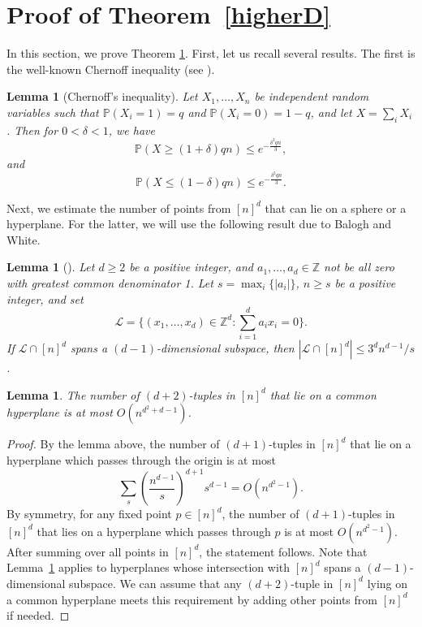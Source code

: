 \documentclass[11pt]{article}
\theoremstyle{plain}
\newtheorem{lemma}[theorem]{Lemma}
\theoremstyle{definition}
\theoremstyle{remark}
\begin{document}
\section{Proof of Theorem~\ref{higherD}} \label{proofhigherD}
%
In this section, we prove Theorem \ref{proofhigherD}.  First, let us recall several results.  The first is the well-known Chernoff inequality (see \cite[Theorem 2.8]{janson}).
%
%
\begin{lemma}[Chernoff's inequality]\label{chernoff}
%
    Let $X_1,\ldots, X_n$ be independent random variables such that $\mathbb{P}(X_i = 1) = q$ and $\mathbb{P}(X_i = 0) = 1-q$, and let $X = \sum_i X_i$. Then for $0 < \delta < 1$, we have
%
$$\mathbb{P}(X \geq (1 + \delta)qn) \leq e^{-\frac{\delta^2qn}{3}},$$and
$$\mathbb{P}(X \leq (1 - \delta)qn) \leq e^{-\frac{\delta^2qn}{3}}.$$
%
%
%
\end{lemma}
%
%
%
%
%
%
Next, we estimate the number of points from $[n]^d$ that can lie on a sphere or a hyperplane.  For the latter, we will use the following result due to Balogh and White.
%
%
%
%
%
\begin{lemma}[\cite{balogh}]\label{hyperplaneBound} 
Let $d \geq 2$ be a positive integer, and $a_1,\ldots,a_d \in \mathbb{Z}$ not be all zero with greatest common denominator 1. Let $s = \max_i\{|a_i|\}$, $n \geq s$ be a positive integer, and set
\[ \mathcal{L} = \{ (x_1,\ldots,x_d) \in \mathbb{Z}^d \colon \sum_{i=1}^d a_ix_i = 0 \}.\]
If $\mathcal{L} \cap [n]^d$ spans a $(d-1)$-dimensional subspace, then $|\mathcal{L} \cap [n]^d| \leq 3^dn^{d-1}/s$. 
%
\end{lemma}
%
%
\begin{lemma}\label{cohyperplaneCount}
%
The number of $(d+2)$-tuples in $[n]^d$ that lie on a common hyperplane is at most $O(n^{d^2+d-1})$. 
%
\end{lemma}
%
\begin{proof} By the lemma above, the number of $(d+1)$-tuples in $[n]^d$ that lie on a hyperplane which passes through the origin is at most
%
    \[ \sum_s \left( \frac{n^{d-1}}{s} \right)^{d+1} s^{d-1} = O(n^{d^2 - 1}). \]
%
\noindent By symmetry, for any fixed point $p\in [n]^d$, the number of $(d+1)$-tuples in $[n]^d$ that lies on a hyperplane which passes through $p$ is at most  $O(n^{d^2 - 1}).$  After summing over all points in $[n]^d$, the statement follows. Note that Lemma~\ref{cohyperplaneCount} applies to hyperplanes whose intersection with $[n]^d$ spans a $(d-1)$-dimensional subspace. We can assume that any $(d+2)$-tuple in $[n]^d$ lying on a common hyperplane meets this requirement by adding other points from $[n]^d$ if needed.\end{proof} 
\end{document}
